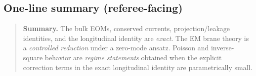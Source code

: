 \documentclass[11pt]{article}
\begin{document}
\subsection{One-line summary (referee-facing)}
\label{app:claims-summary}

\begin{quote}\small
\textbf{Summary.} The bulk EOMs, conserved currents, projection/leakage identities, and the longitudinal identity are \emph{exact}. The EM brane theory is a \emph{controlled reduction} under a zero-mode ansatz. Poisson and inverse-square behavior are \emph{regime statements} obtained when the explicit correction terms in the exact longitudinal identity are parametrically small.
\end{quote}
\end{document}

